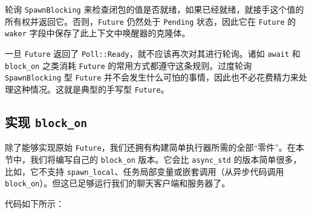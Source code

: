 轮询 \texttt{SpawnBlocking} 来检查闭包的值是否就绪，如果已经就绪，就接手这个值的所有权并返回它。否则，\texttt{Future} 仍然处于 \texttt{Pending} 状态，因此它在 \texttt{Future} 的 \texttt{waker} 字段中保存了此上下文中唤醒器的克隆体。

一旦 \texttt{Future} 返回了 \texttt{Poll::Ready}，就不应该再次对其进行轮询。诸如 \texttt{await} 和 \texttt{block\_on} 之类消耗 \texttt{Future} 的常用方式都遵守这条规则。过度轮询 \texttt{SpawnBlocking} 型 \texttt{Future} 并不会发生什么可怕的事情，因此也不必花费精力来处理这种情况。这就是典型的手写型 \texttt{Future}。

\subsection{实现 \texttt{block\_on}}

除了能够实现原始 \texttt{Future}，我们还拥有构建简单执行器所需的全部“零件”。在本节中，我们将编写自己的 \texttt{block\_on} 版本。它会比 \texttt{async\_std} 的版本简单很多，比如，它不支持 \texttt{spawn\_local}、任务局部变量或嵌套调用（从异步代码调用 \texttt{block\_on}）。但这已足够运行我们的聊天客户端和服务器了。

代码如下所示：

